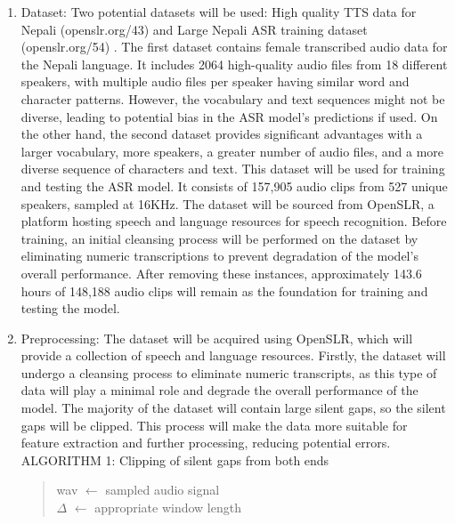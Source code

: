 \begin{enumerate}
	\item Dataset:  Two potential datasets will be used: High quality TTS data for Nepali (openslr.org/43)\cite{kjartansson-etal-tts-sltu2018} and Large Nepali ASR training dataset (openslr.org/54) \cite{kjartansson-etal-sltu2018}. The first dataset contains female transcribed audio data for the Nepali language. It includes 2064 high-quality audio files from 18 different speakers, with multiple audio files per speaker having similar word and character patterns. However, the vocabulary and text sequences might not be diverse, leading to potential bias in the ASR model's predictions if used. On the other hand, the second dataset provides significant advantages with a larger vocabulary, more speakers, a greater number of audio files, and a more diverse sequence of characters and text. This dataset will be used for training and testing the ASR model. It consists of 157,905 audio clips from 527 unique speakers, sampled at 16KHz. The dataset will be sourced from OpenSLR, a platform hosting speech and language resources for speech recognition. Before training, an initial cleansing process will be performed on the dataset by eliminating numeric transcriptions to prevent degradation of the model's overall performance. After removing these instances, approximately 143.6 hours of 148,188 audio clips will remain as the foundation for training and testing the model.

	\item Preprocessing: The dataset will be acquired using OpenSLR, which will provide a collection of speech and language resources. Firstly, the dataset will undergo a cleansing process to eliminate numeric transcripts, as this type of data will play a minimal role and degrade the overall performance of the model. The majority of the dataset will contain large silent gaps, so the silent gaps will be clipped. This process will make the data more suitable for feature extraction and further processing, reducing potential errors.
	\\
	ALGORITHM 1: Clipping of silent gaps from both ends
	\\
	\begin{quote}
	wav $\gets$ sampled audio signal
	\\
    $\Delta$  $\gets$ appropriate window length
    

\end{quote}
\end{enumerate}
